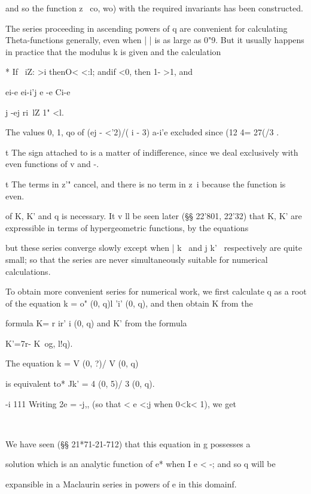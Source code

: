 and so the function z \ co, wo) with the required invariants has been
constructed.


The series proceeding in ascending powers of q are convenient for
calculating Theta-functions generally, even when | | is as large as
0"9. But it usually happens in practice that the modulus k is given
and the calculation

* If \ iZ: >i thenO< <:l; andif <0, then 1- >1, and

ei-e ei-i'j e -e Ci-e

 j -ej ri\ lZ 1" <l.

The values 0, 1, qo of (ej - <'2)/( i - 3) a-i'e excluded since (12 4=
27(/3 .

t The sign attached to is a matter of indifference, since we deal
exclusively with even functions of v and -.

t The terms in z'" cancel, and there is no term in z~i because the
function is even.

%
%

of K, K' and q is necessary. It v ll be seen later (§§ 22'801, 22'32)
that K, K' are expressible in terms of hypergeometric functions, by
the equations

but these series converge slowly except when | k \ and j k' \
respectively are quite small; so that the series are never
simultaneously suitable for numerical calculations.

To obtain more convenient series for numerical work, we first
calculate q as a root of the equation k = o" (0, q)l 'i' (0, q), and
then obtain K from the

formula K= r ir' i (0, q) and K' from the formula

K'=7r- K\ og, l!q).

The equation k = V (0, ?)/ V (0, q)

is equivalent to* Jk' = 4 (0, 5)/ 3 (0, q).

-i 111 Writing 2e = -j,, (so that < e <;j when 0<k< 1), we get

\ %

We have seen (§§ 21*71-21-712) that this equation in g possesses a

solution which is an analytic function of e* when I e < -; and so q
will be

expansible in a Maclaurin series in powers of e in this domainf.

